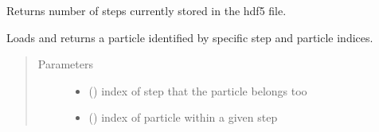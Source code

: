 \documentclass[letterpaper,10pt,english]{sphinxmanual}
\begin{document}
\begin{fulllineitems}
\begin{fulllineitems}
\begin{quote}
\begin{description}
\end{description}\end{quote}

\end{fulllineitems}


\begin{fulllineitems}
\label{\detokenize{source_code:smcpy.hdf5.hdf5_storage.HDF5Storage.get_num_steps}}
Returns number of steps currently stored in the hdf5 file.

\end{fulllineitems}


\begin{fulllineitems}
\label{\detokenize{source_code:smcpy.hdf5.hdf5_storage.HDF5Storage.read_particle}}
Loads and returns a particle identified by specific step and particle
indices.
\begin{quote}\begin{description}
\item[{Parameters}] \leavevmode\begin{itemize}
\item {} 
 () \textendash{} index of step that the particle belongs too

\item {} 
 () \textendash{} index of particle within a given step

\end{itemize}

\end{description}\end{quote}

\end{fulllineitems}



\end{fulllineitems}
\end{document}
